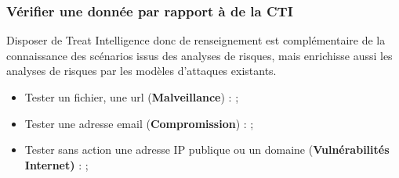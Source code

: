 \subsubsection{Vérifier une donnée par rapport à de la  CTI}

Disposer de Treat Intelligence donc de renseignement  est complémentaire de la connaissance des scénarios issus des analyses de risques, mais enrichisse aussi les analyses de risques par les modèles d'attaques existants.

\begin{itemize}
  \item Tester un fichier, une url (\textbf{Malveillance}) :  ;
  \item Tester une adresse email (\textbf{Compromission})  : ;
  \item Tester sans action une adresse IP publique ou un domaine (\textbf{Vulnérabilités Internet)} : ;
\end{itemize}



